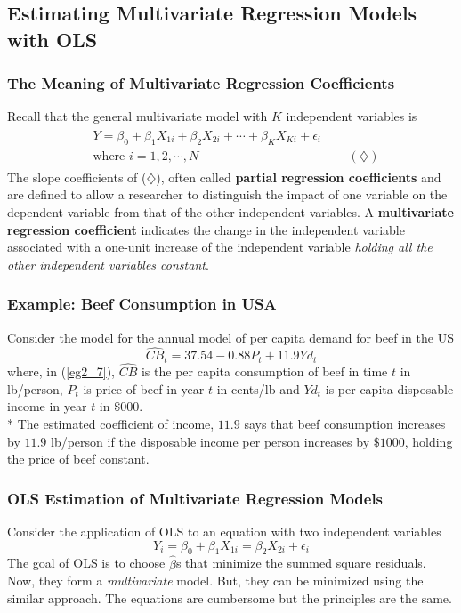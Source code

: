 \documentclass[11pt]{article}
\begin{document}
\subsection{Estimating Multivariate Regression Models with OLS}
\subsubsection{The Meaning of Multivariate Regression Coefficients}
Recall that the general multivariate model with $K$ independent variables is
\begin{align*}
\begin{split} 
&Y= \beta_0 + \beta_1 X_{1i} + \beta_2 X_{2i} + \cdots + \beta_K X_{Ki} + \epsilon_i\\ &\text{where } i=1, 2, \cdots, N \quad\quad\quad\quad\quad\quad\quad\quad\quad\quad\quad\quad (\diamondsuit)
\end{split}
\end{align*}
The slope coefficients of ($\diamondsuit$), often called \textbf{partial regression coefficients} and are defined to allow a researcher to distinguish the impact of one variable on the dependent variable from that of the other independent variables. A \textbf{multivariate regression coefficient} indicates the change in the independent variable associated with a one-unit increase of the independent variable \textit{holding all the other independent variables constant}.
\subsubsection{Example: Beef Consumption in USA}
Consider the model for the annual model of per capita demand for beef in the US
\begin{equation}
\widehat{CB}_t=37.54 -0.88P_t + 11.9Yd_t \label{eg2_7}
\end{equation}
where, in (\ref{eg2_7}), $\widehat{CB}$ is the per capita consumption of beef in time $t$ in lb/person, $P_t$ is price of beef in year $t$ in cents/lb and $Yd_t$ is per capita disposable income in year $t$ in $\$000$.\\*
The estimated coefficient of income, $11.9$ says that beef consumption increases by $11.9$ lb/person if the disposable income per person increases by $\$1000$, holding the price of beef constant.
\subsubsection{OLS Estimation of Multivariate Regression Models}
Consider the application of OLS to an equation with two independent variables
\begin{equation}
Y_i = \beta_0 + \beta_1 X_{1i} = \beta_2 X_{2i} + \epsilon_i \label{eg2_8}
\end{equation}
The goal of OLS is to choose $\hat{\beta}$s that minimize the summed square residuals. Now, they form a \textit{multivariate} model. But, they can be minimized using the similar approach. The equations are cumbersome but the principles are the same.
\end{document}
